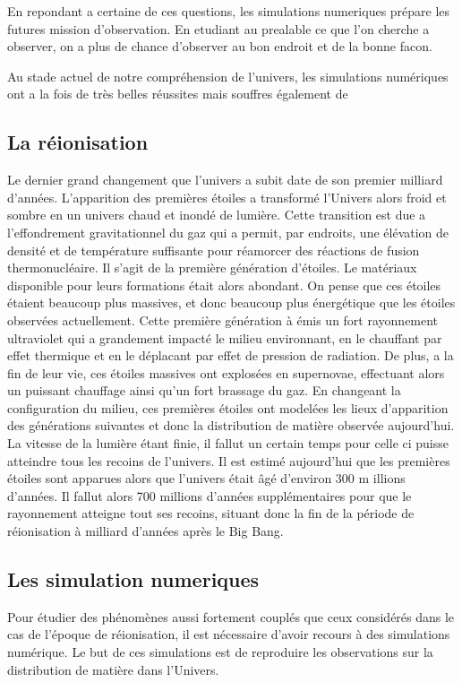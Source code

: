 En repondant a certaine de ces questions, les simulations numeriques prépare les futures mission d'observation.
En etudiant au prealable ce que l'on cherche a  observer, on a plus de chance d'observer au bon endroit et de la bonne facon.


Au stade actuel de notre compréhension de l'univers, les simulations numériques ont a la fois de très belles réussites mais souffres également de 

\subsection*{La réionisation}
Le dernier grand changement que l'univers a subit date de son premier milliard d'années.
L'apparition des premières étoiles a transformé l'Univers alors froid et sombre en un univers chaud et inondé de lumière.
Cette transition est due a l'effondrement gravitationnel du gaz qui a permit, par endroits, une élévation de densité et de température suffisante pour réamorcer des réactions de fusion thermonucléaire.
Il s'agit de la première génération d'étoiles.
Le matériaux disponible pour leurs formations était alors abondant.
On pense que ces étoiles étaient beaucoup plus massives, et donc beaucoup plus énergétique que les étoiles observées actuellement.
Cette première génération à émis un fort rayonnement ultraviolet qui a grandement impacté le milieu environnant, en le chauffant par effet thermique et en le déplacant par effet de pression de radiation.
De plus, a la fin de leur vie, ces étoiles massives ont explosées en supernovae, effectuant alors un puissant chauffage ainsi qu'un fort brassage du gaz.
En changeant la configuration du milieu, ces premières étoiles ont modelées les lieux d'apparition des générations suivantes et donc la distribution de matière observée aujourd'hui.
La vitesse de la lumière étant finie, il fallut un certain temps pour celle ci puisse atteindre tous les recoins de l'univers. Il est estimé aujourd'hui que les premières étoiles sont apparues alors que l'univers était âgé d'environ 300 m
illions d'années. Il fallut alors 700 millions d'années supplémentaires pour que le rayonnement atteigne tout ses recoins, situant donc la fin de la période de  réionisation à milliard d'années après le Big Bang.

\subsection*{Les simulation numeriques}
Pour étudier des phénomènes aussi fortement couplés que ceux considérés dans le cas de l'époque de réionisation, il est nécessaire d'avoir recours à des simulations numérique. 
Le but de ces simulations est de reproduire les observations sur la distribution de matière dans l'Univers.

